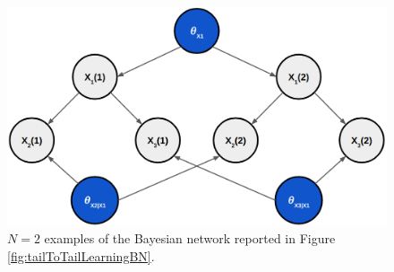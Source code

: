 \begin{figure}
    \centering
    \includegraphics[width=\textwidth]{images/learningBNSmallExample.png}
    \caption{$N=2$ examples of the Bayesian network reported in Figure \ref{fig:tailToTailLearningBN}.}
    \label{fig:learningBNSmallExample}
\end{figure}

